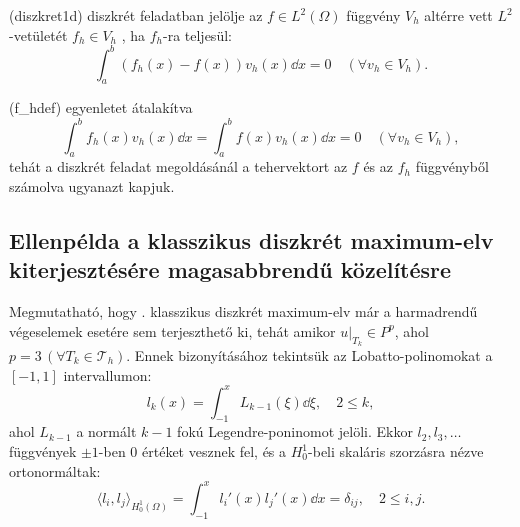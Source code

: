 \begin{definition}
	\Aref({diszkret1d}) diszkrét feladatban jelölje az $f \in L^2(\Omega)$  függvény $V_h$ altérre vett $L^2$-vetületét $f_h \in V_h$ , ha $f_h$-ra teljesül:
	\begin{equation}\label{f_hdef}
		\int_a^b (f_h(x) - f(x)) v_h(x) \dd x = 0 \quad (\forall v_h \in V_h).
	\end{equation}
\end{definition}
\begin{remark}
	\Aref({f_hdef}) egyenletet átalakítva
	\begin{equation}
		\int_a^b f_h(x) v_h(x) \dd x  =  \int_a^b f(x) v_h(x) \dd x  = 0 \quad (\forall v_h \in V_h), 
	\end{equation}
	tehát a diszkrét feladat megoldásánál a tehervektort az $f$ és az $f_h$ függvényből számolva ugyanazt kapjuk.
\end{remark}

\subsection{Ellenpélda a klasszikus diszkrét maximum-elv kiterjesztésére magasabbrendű közelítésre}

Megmutatható, hogy . klasszikus diszkrét maximum-elv már a harmadrendű végeselemek esetére sem terjeszthető ki, tehát amikor $u|_{T_k} \in P^{p}$, ahol $p = 3 \, (\forall T_k \in \mathcal{T}_h) $. Ennek bizonyításához tekintsük az Lobatto-polinomokat a $[-1, 1]$ intervallumon:
\begin{equation}\label{lobatto}
	l_k(x)= \int_{-1}^x L_{k-1}(\xi) \dd \xi, \quad 2 \leq k,
\end{equation}
ahol $L_{k-1}$ a normált $k-1$ fokú Legendre-poninomot jelöli. Ekkor $l_2, l_3, \ldots$ függvények $\pm 1$-ben $0$ értéket vesznek fel, és a $H_0^1$-beli skaláris szorzásra nézve ortonormáltak:
\begin{equation}\label{eq:legendre_on}
	\langle l_i, l_j \rangle_{H^1_0(\Omega)} = \int_{-1}^x l_i'(x)  l_j'(x) \dd x = \delta_{ij}, \quad 2 \leq i,j.
\end{equation}


